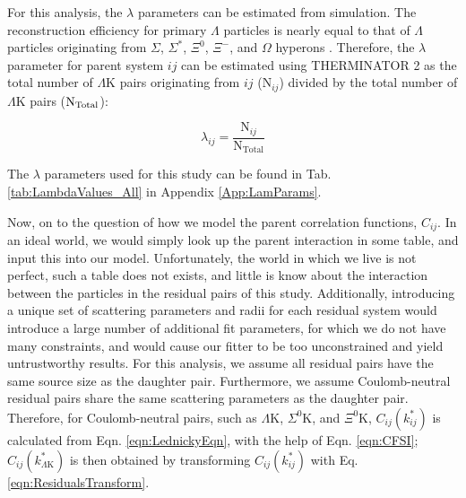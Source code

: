 \documentclass[ALICE,manyauthors]{cernphprep}
\newcommand{\Lam}{$\Lambda$\xspace}
\newcommand{\LamK}{$\Lambda$K\xspace}
\begin{document}
For this analysis, the $\lambda$ parameters can be estimated from simulation.  
The reconstruction efficiency for primary \Lam particles is nearly equal to that of \Lam particles originating from $\Sigma$, $\Sigma^{*}$, $\Xi^{0}$, $\Xi^{-}$, and $\Omega$ hyperons \cite{Salzwedel:2241303}.  
Therefore, the $\lambda$ parameter for parent system $ij$ can be estimated using THERMINATOR 2 as the total number of \LamK pairs originating from $ij$ ($\mathrm{N}_{ij}$) divided by the total number of \LamK pairs ($\rm N_{Total}$): 

\begin{equation}
\lambda_{ij} = \frac{\mathrm{N}_{ij}}{\mathrm{N_{Total}}}
\end{equation}

The $\lambda$ parameters used for this study can be found in Tab. \ref{tab:LambdaValues_All} in Appendix \ref{App:LamParams}.

Now, on to the question of how we model the parent correlation functions, $C_{ij}$.  
In an ideal world, we would simply look up the parent interaction in some table, and input this into our model.  
Unfortunately, the world in which we live is not perfect, such a table does not exists, and little is know about the interaction between the particles in the residual pairs of this study. 
Additionally, introducing a unique set of scattering parameters and radii for each residual system would introduce a large number of additional fit parameters, for which we do not have many constraints, and would cause our fitter to be too unconstrained and yield untrustworthy results. 
For this analysis, we assume all residual pairs have the same source size as the daughter pair.
Furthermore, we assume Coulomb-neutral residual pairs share the same scattering parameters as the daughter pair.
Therefore, for Coulomb-neutral pairs, such as \LamK, $\Sigma^{0}$K, and $\Xi^{0}$K, $C_{ij}(k^{*}_{ij})$ is calculated from Eqn. \ref{eqn:LednickyEqn}, with the help of Eqn. \ref{eqn:CFSI}; $C_{ij}(k^{*}_{\Lambda\mathrm{K}})$ is then obtained by transforming $C_{ij}(k^{*}_{ij})$ with Eq. \ref{eqn:ResidualsTransform}.  
\end{document}
